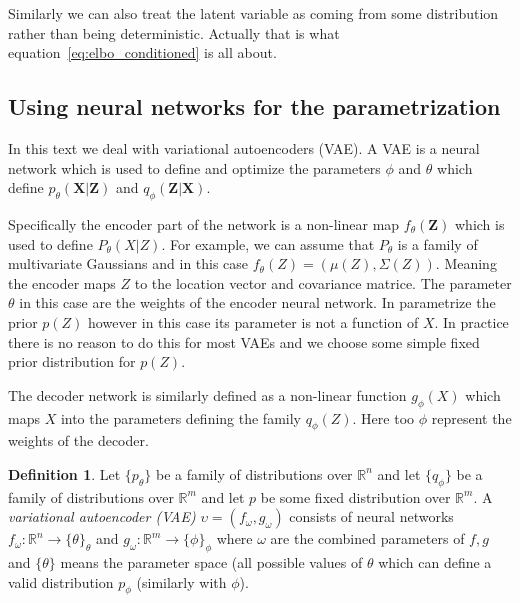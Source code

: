 \documentclass[11pt, a4paper]{report}
\theoremstyle{plain}
\theoremstyle{definition}
\newtheorem{mydef}{Definition}[chapter]
\theoremstyle{remark}
\newcommand{\R}{\mathbb{R}}
\newcommand{\X}{\mathbf{X}}
\newcommand{\Z}{\mathbf{Z}}
\begin{document}
Similarly we can also treat the latent variable as coming from some distribution
rather than being deterministic. Actually that is what
equation~\ref{eq:elbo_conditioned}
is all about.

\subsection{Using neural networks for the parametrization}
In this text we deal with variational autoencoders (VAE).
A VAE is a neural network which is used to define and optimize the parameters
$\phi$ and $\theta$ which define $p_{\theta}(\X | \Z)$ and $q_{\phi}(\Z | \X)$.

Specifically the encoder part of the network is a non-linear map $f_{\theta}(\Z)$ which is
used to define $P_{\theta}(X|Z)$. For example, we can assume that $P_{\theta}$
is a family of multivariate Gaussians and in this case $f_{\theta}(Z) =
(\mu(Z), \Sigma(Z))$. Meaning the encoder maps $Z$ to the location vector and
covariance matrice. The parameter $\theta$ in this case are the weights of the
encoder neural network. In parametrize the prior $p(Z)$ however in this case its
parameter is not a function of $X$. In practice there is no reason to do this
for most VAEs and we choose some simple fixed prior distribution for $p(Z)$.

The decoder network is similarly defined as a non-linear function $g_{\phi}(X)$ which
maps $X$ into the parameters defining the family $q_{\phi}(Z)$. Here too $\phi$
represent the weights of the decoder.

\begin{mydef}
\label{def:vae}
Let $\{p_{\theta}\}$ be a family of distributions over $\R^n$ and let
$\{q_{\phi}\}$ be a family of distributions over $\R^m$ and let $p$ be some
fixed distribution over $\R^m$. A \emph{variational autoencoder (VAE)} $\upsilon
= (f_{\omega}, g_{\omega})$ consists of neural networks $f_{\omega}: \R^n \to
\{\theta\}_{\theta}$ and $g_{\omega}: \R^m \to \{\phi\}_{\phi}$ where $\omega$
are the combined parameters of $f,g$ and $\{\theta \}$ means the parameter space
(all possible values of $\theta$ which can define a valid distribution
$p_{\phi}$ (similarly with $\phi$). \end{mydef}


\end{document}

